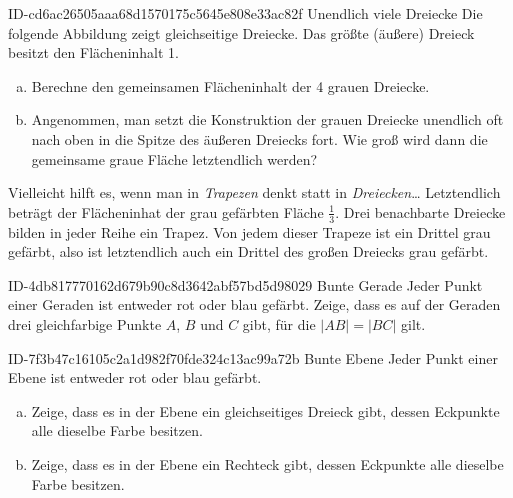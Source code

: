 \begin{exercise}
      {ID-cd6ac26505aaa68d1570175c5645e808e33ac82f}
      {Unendlich viele Dreiecke}
  \newcommand{\topdowntriangle}[3]
  {%
    \filldraw[fill=black!40!white] (#1, #2) -- ++(60:#3) -- ++(180:#3) -- cycle;
  }%
  \ifproblem\problem
    Die folgende Abbildung zeigt gleichseitige Dreiecke. Das größte (äußere) Dreieck
    besitzt den Flächeninhalt 1.
    \begin{center}
    \end{center}
    \begin{enumerate}[a)]
      \item Berechne den gemeinsamen Flächeninhalt der 4 grauen Dreiecke.
      \item Angenommen, man setzt die Konstruktion der grauen Dreiecke
            unendlich oft nach oben in die Spitze des äußeren Dreiecks fort.
            Wie groß wird dann die gemeinsame graue Fläche letztendlich werden?
    \end{enumerate}
  \fi
  \ifoutline\outline
    Vielleicht hilft es, wenn man in \textit{Trapezen} denkt statt in \textit{Dreiecken}\ldots
  \fi
  \ifoutcome\outcome
    Letztendlich beträgt der Flächeninhat der grau gefärbten Fläche $\frac{1}{3}$.
    Drei benachbarte Dreiecke bilden in jeder \glqq Reihe\grqq{} ein Trapez.
    Von jedem dieser Trapeze ist ein Drittel grau gefärbt, also ist letztendlich
    auch ein Drittel des großen Dreiecks grau gefärbt.
  \fi
\end{exercise}

\begin{exercise}
      {ID-4db817770162d679b90c8d3642abf57bd5d98029}
      {Bunte Gerade}
  \ifproblem\problem
    Jeder Punkt einer Geraden ist entweder rot oder blau gefärbt.
    Zeige, dass es auf der Geraden drei gleichfarbige Punkte $A$,
    $B$ und $C$ gibt, für die $|AB|=|BC|$ gilt.
  \fi
\end{exercise}

\begin{exercise}
      {ID-7f3b47c16105c2a1d982f70fde324c13ac99a72b}
      {Bunte Ebene}
  \ifproblem\problem
    Jeder Punkt einer Ebene ist entweder rot oder blau gefärbt.
    \begin{enumerate}[a)]
      \item Zeige, dass es in der Ebene ein gleichseitiges Dreieck gibt,
            dessen Eckpunkte alle dieselbe Farbe besitzen.
      \item Zeige, dass es in der Ebene ein Rechteck gibt,
            dessen Eckpunkte alle dieselbe Farbe besitzen.
    \end{enumerate}
  \fi
\end{exercise}

